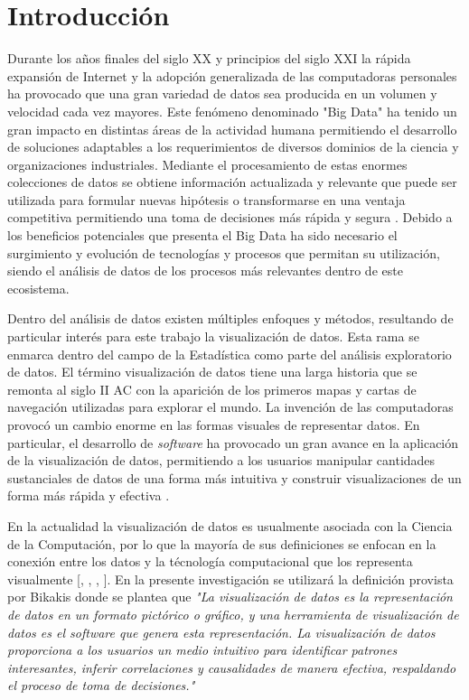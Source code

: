 \chapter*{Introducción}\label{chapter:introduction}

Durante los a\~nos finales del siglo XX y principios del siglo XXI la
r\'apida expansi\'on de Internet y la adopci\'on generalizada de las
computadoras personales ha provocado que una gran variedad de datos sea
producida en un volumen y velocidad cada vez mayores. Este fen\'omeno
denominado "Big Data" \cite{beyer2012importance} ha tenido un gran impacto en distintas \'areas de
la actividad humana permitiendo el desarrollo de soluciones adaptables a los
requerimientos de diversos dominios de la ciencia y organizaciones industriales.
Mediante el procesamiento de estas enormes colecciones de datos se
obtiene informaci\'on actualizada y relevante que puede ser utilizada para
formular nuevas hip\'otesis o transformarse en una ventaja competitiva permitiendo
una toma de decisiones m\'as r\'apida y segura \cite{de2016formal}. Debido a los beneficios potenciales
que presenta el Big Data ha sido necesario el surgimiento y evoluci\'on de
tecnolog\'ias y procesos que permitan su utilizaci\'on, siendo el an\'alisis
de datos de los procesos m\'as relevantes dentro de este ecosistema.

Dentro del an\'alisis de datos existen m\'ultiples enfoques y m\'etodos, resultando
de particular inter\'es para este trabajo la visualizaci\'on de datos. Esta rama se enmarca
dentro del campo de la Estad\'istica como parte del an\'alisis exploratorio de datos.
El t\'ermino visualizaci\'on de datos tiene una larga historia que se remonta al
siglo II AC con la aparici\'on de los primeros mapas y cartas de navegaci\'on utilizadas
para explorar el mundo. La invenci\'on de las computadoras provoc\'o un cambio enorme
en las formas visuales de representar datos. En particular, el desarrollo de \textit{software} ha provocado
un gran avance en la aplicaci\'on de la visualizaci\'on de datos, permitiendo a los usuarios
manipular cantidades sustanciales de datos de una forma m\'as intuitiva y construir
visualizaciones de un forma m\'as r\'apida y efectiva \cite{li2020overview}. 

En la actualidad la visualizaci\'on de datos
es usualmente asociada con la Ciencia de la Computaci\'on, por lo que la mayor\'ia
de sus definiciones se enfocan en la conexi\'on entre los datos y la t\'ecnolog\'ia
computacional que los representa visualmente 
[\cite*{card1999readings}, \cite*{friendly2001milestones}, \cite*{manovich2010visualization}, \cite*{kirk2012data}].
En la presente investigaci\'on se utilizar\'a la definici\'on provista por
Bikakis \cite{bikakis2018big} donde se plantea que 
    \textit{"La visualizaci\'on de datos es la representación de datos en un
    formato pictórico o gráfico, y una herramienta de visualización de
    datos es el software que genera esta representación. La visualización
    de datos proporciona a los usuarios un medio intuitivo para identificar patrones
    interesantes, inferir correlaciones y causalidades de manera efectiva,
    respaldando el proceso de toma de decisiones."}


